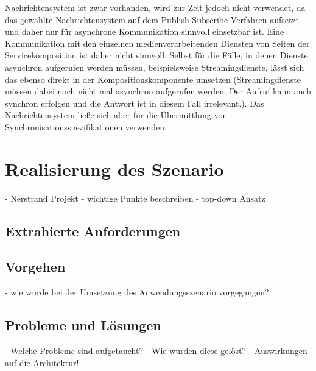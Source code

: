   Nachrichtensystem ist zwar vorhanden, wird zur Zeit jedoch nicht verwendet, da das gewählte Nachrichtensystem auf dem Publish-Subscribe-Verfahren aufsetzt und daher nur für asynchrone Kommunikation sinnvoll einsetzbar ist. Eine Kommunikation mit den einzelnen medienverarbeitenden Diensten von Seiten der Servicekomposition ist daher nicht sinnvoll. Selbst für die Fälle, in denen Dienste asynchron aufgerufen werden müssen, beispielsweise Streamingdienste, lässt sich das ebenso direkt in der Kompositionskomponente umsetzen (Streamingdienste müssen dabei noch nicht mal asynchron aufgerufen werden. Der Aufruf kann auch synchron erfolgen und die Antwort ist in diesem Fall irrelevant.). Das Nachrichtensystem ließe sich aber für die Übermittlung von Synchronisationsspezifikationen verwenden.



\section{Realisierung des Szenario} %
\label{sec:realisierung_des_szenario}

  - Nerstrand Projekt
  - wichtige Punkte beschreiben
  - top-down Ansatz

\subsection{Extrahierte Anforderungen} %
\label{sub:extrahierte_anforderungen}


\subsection{Vorgehen} %
\label{sub:vorgehen_szenario}

  - wie wurde bei der Umsetzung des Anwendungsszenario vorgegangen?


\subsection{Probleme und Lösungen} %
\label{sub:probleme_und_loesungen_szenario}

  - Welche Probleme sind aufgetaucht?
  - Wie wurden diese gelöst?
  - Auswirkungen auf die Architektur!



